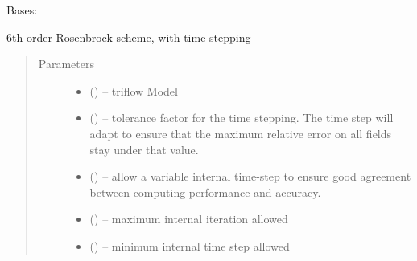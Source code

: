 \documentclass[letterpaper,10pt,english]{sphinxmanual}
\begin{document}
\begin{fulllineitems}
\label{\detokenize{triflow.plugins:triflow.plugins.schemes.RODASPR}}
Bases: {\hyperref[\detokenize{triflow.plugins:triflow.plugins.schemes.ROW_general}]{}}

6th order Rosenbrock scheme, with time stepping
\begin{quote}\begin{description}
\item[{Parameters}] \leavevmode\begin{itemize}
\item {} 
 () -- triflow Model

\item {} 
 (\sphinxstyleliteralemphasis{, }\sphinxstyleliteralemphasis{, }) -- tolerance factor for the time stepping. The time step will adapt to ensure that the maximum relative error on all fields stay under that value.

\item {} 
 (\sphinxstyleliteralemphasis{, }\sphinxstyleliteralemphasis{, }) -- allow a variable internal time-step to ensure good agreement between computing performance and accuracy.

\item {} 
 (\sphinxstyleliteralemphasis{, }\sphinxstyleliteralemphasis{, }) -- maximum internal iteration allowed

\item {} 
 (\sphinxstyleliteralemphasis{, }\sphinxstyleliteralemphasis{, }) -- minimum internal time step allowed


\end{itemize}
\end{description}
\end{quote}
\end{fulllineitems}
\end{document}
